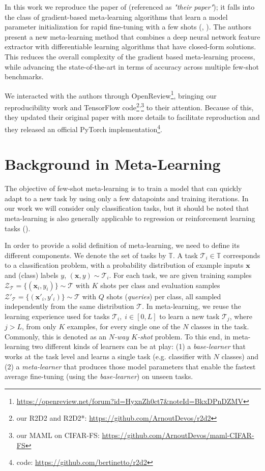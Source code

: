 In this work we reproduce the paper of \citet{R2D2} (referenced as \textit{"their paper"}); it falls into the class of gradient-based meta-learning algorithms that learn a model parameter initialization for rapid fine-tuning with a few shots (\citet{finn}, \citet{reptile}). The authors present a new meta-learning method that combines a deep neural network feature extractor with differentiable learning algorithms that have closed-form solutions. This reduces the overall complexity of the gradient based meta-learning process, while advancing the state-of-the-art in terms of accuracy across multiple few-shot benchmarks.

We interacted with the authors through OpenReview\footnote{\url{https://openreview.net/forum?id=HyxnZh0ct7&noteId=BkxDPnDZMV}}, bringing our reproducibility work and TensorFlow code\footnote{our R2D2 and R2D2*: \url{https://github.com/ArnoutDevos/r2d2}}\textsuperscript{,}\footnote{our MAML on \textsc{CIFAR-FS}: \url{https://github.com/ArnoutDevos/maml-CIFAR-FS}} to their attention. Because of this, they updated their original paper with more details to facilitate reproduction and they released an official PyTorch implementation\footnote{\citet{R2D2} code: \url{https://github.com/bertinetto/r2d2}}.

\section{Background in Meta-Learning}
\label{related}
The objective of few-shot meta-learning is to train a model that can quickly adapt to a new task by using only a few datapoints and training iterations. In our work we will consider only classification tasks, but it should be noted that meta-learning is also generally applicable to regression or reinforcement learning tasks (\citet{finn}).

In order to provide a solid definition of meta-learning, we need to define its different components. We denote the set of tasks by $\mathbb{T}$. A task $\mathcal{T}_i \in \mathbb{T}$ corresponds to a classification problem, with a probability distribution of example inputs $\bm{x}$ and (class) labels $y$, $(\bm{x}, y) \sim\mathcal{T}_i$. For each task, we are given training samples $\mathcal{Z}_\mathcal{T}=\{ (\bm{x}_i,y_i) \} \sim \mathcal{T}$ with $K$ shots per class and evaluation samples $\mathcal{Z}'_\mathcal{T}=\{ (\bm{x}'_i,y'_i)\} \sim \mathcal{T}$ with $Q$ shots (\textit{queries}) per class, all sampled independently from the same distribution $\mathcal{T}$. In meta-learning, we reuse the learning experience used for tasks $\mathcal{T}_i, \; i\in [0, L]$ to learn a new task $\mathcal{T}_j$, where $j>L$, from only $K$ examples, for every single one of the $N$ classes in the task. Commonly, this is denoted as an \textit{$N$-way $K$-shot} problem. To this end, in meta-learning two different kinds of learners can be at play: (1) a \textit{base-learner} that works at the task level and learns a single task (e.g. classifier with $N$ classes) and (2) a \textit{meta-learner} that produces those model parameters that enable the fastest average fine-tuning (using the \textit{base-learner}) on unseen tasks.

